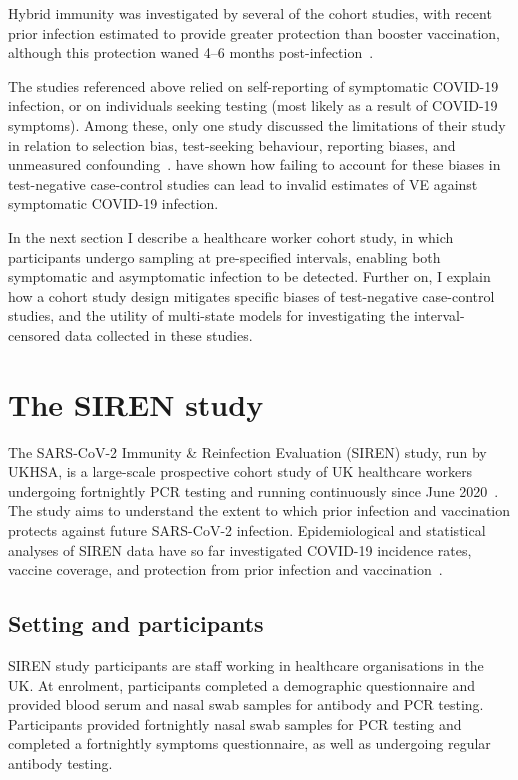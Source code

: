 Hybrid immunity was investigated by several of the cohort studies, with recent prior infection estimated to provide greater protection than booster vaccination, although this protection waned 4--6 months post-infection~\parencite{Huiberts2023-kq, Auvigne2023-ay}.

The studies referenced above relied on self-reporting of symptomatic COVID-19 infection, or on individuals seeking testing (most likely as a result of COVID-19 symptoms). Among these, only one study discussed the limitations of their study in relation to selection bias, test-seeking behaviour, reporting biases, and unmeasured confounding~\parencite{Plumb2023-ht}. \cite{Shi2023-ic} have shown how failing to account for these biases in test-negative case-control studies can lead to invalid estimates of VE against symptomatic COVID-19 infection.

In the next section I describe a healthcare worker cohort study, in which participants undergo sampling at pre-specified intervals, enabling both symptomatic and asymptomatic infection to be detected. Further on, I explain how a cohort study design mitigates specific biases of test-negative case-control studies, and the utility of multi-state models for investigating the interval-censored data collected in these studies.

\section{The SIREN study}

The SARS-CoV-2 Immunity \& Reinfection Evaluation (SIREN) study, run by UKHSA, is a large-scale prospective cohort study of UK healthcare workers undergoing fortnightly PCR testing and running continuously since June 2020~\parencite{Wallace2022-vs}. The study aims to understand the extent to which prior infection and vaccination protects against future SARS-CoV-2 infection. Epidemiological and statistical analyses of SIREN data have so far investigated COVID-19 incidence rates, vaccine coverage, and protection from prior infection and vaccination~\parencite{Hall2021-rh, Hall2021-si, Hall2022-ep}.

\subsection{Setting and participants}

SIREN study participants are staff working in healthcare organisations in the UK\@. At enrolment, participants completed a demographic questionnaire and provided blood serum and nasal swab samples for antibody and PCR testing. Participants provided fortnightly nasal swab samples for PCR testing and completed a fortnightly symptoms questionnaire, as well as undergoing regular antibody testing.

